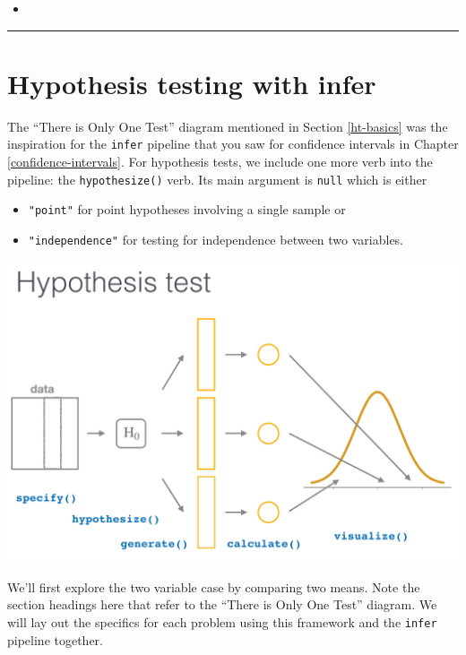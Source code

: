 \documentclass[12pt, krantz2,]{krantz}
\providecommand{\tightlist}{%
  \setlength{\itemsep}{0pt}\setlength{\parskip}{0pt}}
\newenvironment{rmdblock}[1]
  {\begin{shaded*}
  \begin{itemize}
  \renewcommand{\labelitemi}{
    \raisebox{-.7\height}[0pt][0pt]{
    }
  }
  \item
  }
  {
  \end{itemize}
  \end{shaded*}
  }
\newenvironment{learncheck}
  {\begin{rmdblock}{warning}}
  {\end{rmdblock}}
\begin{document}
\begin{learncheck}

\end{learncheck}

\begin{center}\rule{0.5\linewidth}{\linethickness}\end{center}

\hypertarget{hypothesis-testing-with-infer}{%
\section{Hypothesis testing with infer}\label{hypothesis-testing-with-infer}}

The ``There is Only One Test'' diagram mentioned in Section \ref{ht-basics} was the inspiration for the \texttt{infer} pipeline that you saw for confidence intervals in Chapter \ref{confidence-intervals}. For hypothesis tests, we include one more verb into the pipeline: the \texttt{hypothesize()} verb. Its main argument is \texttt{null} which is either

\begin{itemize}
\tightlist
\item
  \texttt{"point"} for point hypotheses involving a single sample or
\item
  \texttt{"independence"} for testing for independence between two variables.
\end{itemize}

\begin{center}\includegraphics[width=\textwidth]{images/flowcharts/infer/ht} \end{center}

We'll first explore the two variable case by comparing two means. Note the section headings here that refer to the ``There is Only One Test'' diagram. We will lay out the specifics for each problem using this framework and the \texttt{infer} pipeline together.
\end{document}
